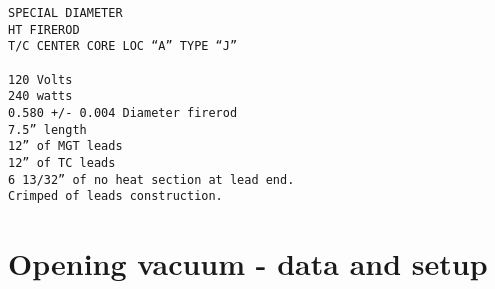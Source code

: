 \begin{verbatim}
SPECIAL DIAMETER
HT FIREROD   
T/C CENTER CORE LOC “A” TYPE “J”
 
120 Volts
240 watts
0.580 +/- 0.004 Diameter firerod
7.5” length
12” of MGT leads
12” of TC leads
6 13/32” of no heat section at lead end.
Crimped of leads construction.
\end{verbatim}

\section{Opening vacuum - data and setup}







%
%
%
%
%
%
%


%
%
